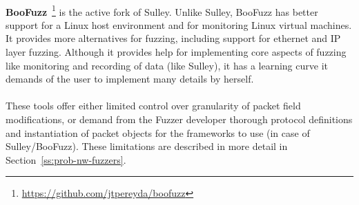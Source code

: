 \paragraph{}\textbf{BooFuzz}~\footnote{\url{https://github.com/jtpereyda/boofuzz}} is the active fork of Sulley. Unlike Sulley, BooFuzz has better
support for a Linux host environment and for monitoring Linux virtual
machines. It provides more alternatives for fuzzing, including support for
ethernet and IP layer fuzzing. Although it provides help for implementing
core aspects of fuzzing like monitoring and recording of data (like
Sulley), it has a learning curve it demands of the user to
implement many details by herself.

\paragraph{}
These tools offer either limited control over granularity of packet field
modifications, or demand from the Fuzzer developer thorough protocol
definitions and instantiation of packet objects for the frameworks to
use (in case of Sulley/BooFuzz). These limitations are described in
more detail in Section~\ref{ss:prob-nw-fuzzers}.
